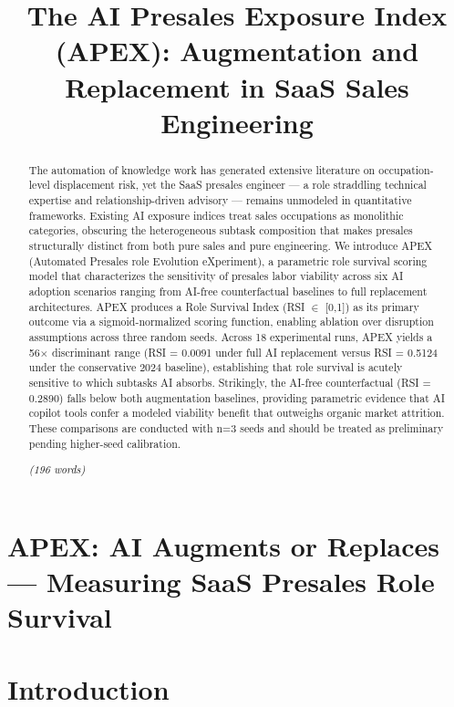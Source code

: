 \documentclass[10pt, conference]{IEEEtran}
\title{The AI Presales Exposure Index (APEX): Augmentation and Replacement in SaaS Sales Engineering}
\author{\IEEEauthorblockN{Akash Anipakalu Giridhar}}
\begin{document}
\begin{abstract}
The automation of knowledge work has generated extensive literature on occupation-level displacement risk, yet the SaaS presales engineer --- a role straddling technical expertise and relationship-driven advisory --- remains unmodeled in quantitative frameworks. Existing AI exposure indices \cite{chang2024survey} treat sales occupations as monolithic categories, obscuring the heterogeneous subtask composition that makes presales structurally distinct from both pure sales and pure engineering. We introduce APEX (Automated Presales role Evolution eXperiment), a parametric role survival scoring model that characterizes the sensitivity of presales labor viability across six AI adoption scenarios ranging from AI-free counterfactual baselines to full replacement architectures. APEX produces a Role Survival Index (RSI $\in$ [0,1]) as its primary outcome via a sigmoid-normalized scoring function, enabling ablation over disruption assumptions across three random seeds. Across 18 experimental runs, APEX yields a 56$\times$ discriminant range (RSI = 0.0091 under full AI replacement versus RSI = 0.5124 under the conservative 2024 baseline), establishing that role survival is acutely sensitive to which subtasks AI absorbs. Strikingly, the AI-free counterfactual (RSI = 0.2890) falls below both augmentation baselines, providing parametric evidence that AI copilot tools confer a modeled viability benefit that outweighs organic market attrition. These comparisons are conducted with n=3 seeds and should be treated as preliminary pending higher-seed calibration.

\textit{(196 words)}
\end{abstract}

\maketitle
\begin{abstract}

\end{abstract}

\section{APEX: AI Augments or Replaces — Measuring SaaS Presales Role Survival}

\label{sec:apex_ai_augments_or_replaces_measuring_s}

\section{Introduction}
\end{document}
